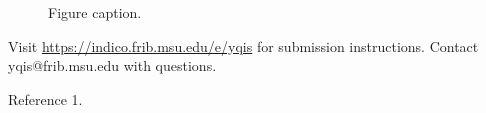 \documentclass[11pt]{article}                                  %
\begin{document}
\begin{figure}[h!]
    \centering
    \caption{Figure caption.}
    \label{fig:my_label}
\end{figure}


Visit \href{https://indico.frib.msu.edu/e/yqis}{https://indico.frib.msu.edu/e/yqis} for submission instructions.
Contact yqis@frib.msu.edu with questions.




%
\begin{enumerate}
\itemsep=-5pt 

 Reference 1.

\end{enumerate}
\end{document}

